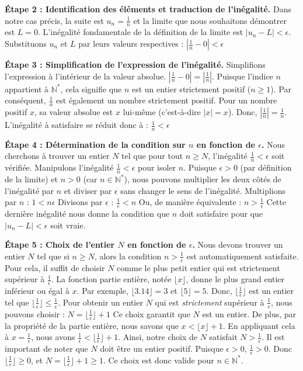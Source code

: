 \documentclass[a4paper,11pt]{report}
\begin{document}
\textbf{Étape 2 : Identification des éléments et traduction de l'inégalité.}
Dans notre cas précis, la suite est $u_n = \frac{1}{n}$ et la limite que nous souhaitons démontrer est $L=0$.
L'inégalité fondamentale de la définition de la limite est $|u_n - L| < \epsilon$.
Substituons $u_n$ et $L$ par leurs valeurs respectives :
$\left| \frac{1}{n} - 0 \right| < \epsilon$

\textbf{Étape 3 : Simplification de l'expression de l'inégalité.}
Simplifions l'expression à l'intérieur de la valeur absolue.
$\left| \frac{1}{n} - 0 \right| = \left| \frac{1}{n} \right|$.
Puisque l'indice $n$ appartient à $\mathbb{N}^*$, cela signifie que $n$ est un entier strictement positif ($n \ge 1$). Par conséquent, $\frac{1}{n}$ est également un nombre strictement positif.
Pour un nombre positif $x$, sa valeur absolue est $x$ lui-même (c'est-à-dire $|x|=x$).
Donc, $\left| \frac{1}{n} \right| = \frac{1}{n}$.
L'inégalité à satisfaire se réduit donc à :
$\frac{1}{n} < \epsilon$

\textbf{Étape 4 : Détermination de la condition sur $n$ en fonction de $\epsilon$.}
Nous cherchons à trouver un entier $N$ tel que pour tout $n \ge N$, l'inégalité $\frac{1}{n} < \epsilon$ soit vérifiée.
Manipulons l'inégalité $\frac{1}{n} < \epsilon$ pour isoler $n$.
Puisque $\epsilon > 0$ (par définition de la limite) et $n > 0$ (car $n \in \mathbb{N}^*$), nous pouvons multiplier les deux côtés de l'inégalité par $n$ et diviser par $\epsilon$ sans changer le sens de l'inégalité.
Multiplions par $n$ :
$1 < n \epsilon$
Divisons par $\epsilon$ :
$\frac{1}{\epsilon} < n$
Ou, de manière équivalente :
$n > \frac{1}{\epsilon}$
Cette dernière inégalité nous donne la condition que $n$ doit satisfaire pour que $|u_n - L| < \epsilon$ soit vraie.

\textbf{Étape 5 : Choix de l'entier $N$ en fonction de $\epsilon$.}
Nous devons trouver un entier $N$ tel que si $n \ge N$, alors la condition $n > \frac{1}{\epsilon}$ est automatiquement satisfaite.
Pour cela, il suffit de choisir $N$ comme le plus petit entier qui est strictement supérieur à $\frac{1}{\epsilon}$.
La fonction partie entière, notée $\lfloor x \rfloor$, donne le plus grand entier inférieur ou égal à $x$. Par exemple, $\lfloor 3.14 \rfloor = 3$ et $\lfloor 5 \rfloor = 5$.
Donc, $\lfloor \frac{1}{\epsilon} \rfloor$ est un entier tel que $\lfloor \frac{1}{\epsilon} \rfloor \le \frac{1}{\epsilon}$.
Pour obtenir un entier $N$ qui est \textit{strictement} supérieur à $\frac{1}{\epsilon}$, nous pouvons choisir :
$N = \lfloor \frac{1}{\epsilon} \rfloor + 1$
Ce choix garantit que $N$ est un entier. De plus, par la propriété de la partie entière, nous savons que $x < \lfloor x \rfloor + 1$. En appliquant cela à $x = \frac{1}{\epsilon}$, nous avons $\frac{1}{\epsilon} < \lfloor \frac{1}{\epsilon} \rfloor + 1$.
Ainsi, notre choix de $N$ satisfait $N > \frac{1}{\epsilon}$.
Il est important de noter que $N$ doit être un entier positif. Puisque $\epsilon > 0$, $\frac{1}{\epsilon} > 0$. Donc $\lfloor \frac{1}{\epsilon} \rfloor \ge 0$, et $N = \lfloor \frac{1}{\epsilon} \rfloor + 1 \ge 1$. Ce choix est donc valide pour $n \in \mathbb{N}^*$.
\end{document}
